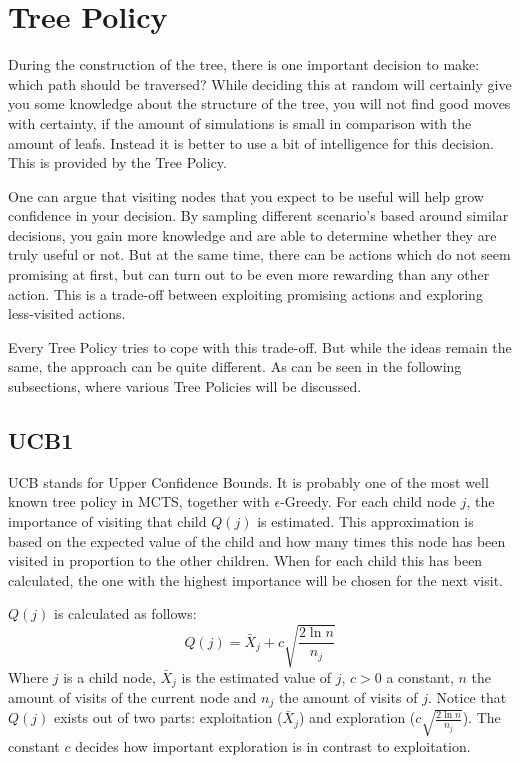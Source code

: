 \section{Tree Policy}

During the construction of the tree, there is one important decision to make: which path should be traversed? While deciding this at random will certainly give you some knowledge about the structure of the tree, you will not find good moves with certainty, if the amount of simulations is small in comparison with the amount of leafs. Instead it is better to use a bit of intelligence for this decision. This is provided by the Tree Policy. 

One can argue that visiting nodes that you expect to be useful will help grow confidence in your decision. By sampling different scenario's based around similar decisions, you gain more knowledge and are able to determine whether they are truly useful or not. But at the same time, there can be actions which do not seem promising at first, but can turn out to be even more rewarding than any other action. This is a trade-off between exploiting promising actions and exploring less-visited actions.

Every Tree Policy tries to cope with this trade-off. But while the ideas remain the same, the approach can be quite different. As can be seen in the following subsections, where various Tree Policies will be discussed.

\subsection{UCB1}
UCB stands for Upper Confidence Bounds. It is probably one of the most well known tree policy in MCTS, together with $\epsilon$-Greedy. For each child node $j$, the importance of visiting that child $Q(j)$ is estimated. This approximation is based on the expected value of the child and how many times this node has been visited in proportion to the other children. When for each child this has been calculated, the one with the highest importance will be chosen for the next visit. 

$Q(j)$ is calculated as follows:
\begin{equation}
Q(j) = \bar{X}_j + c\sqrt{\frac{2 \ln n}{n_j}}
\end{equation}
Where $j$ is a child node, $\bar{X}_j$ is the estimated value of $j$, $c > 0$ a constant, $n$ the amount of visits of the current node and $n_j$ the amount of visits of $j$. Notice that $Q(j)$ exists out of two parts: exploitation ($\bar{X}_j$) and exploration ($c\sqrt{\frac{2 \ln n}{n_j}}$). The constant $c$ decides how important exploration is in contrast to exploitation. 

